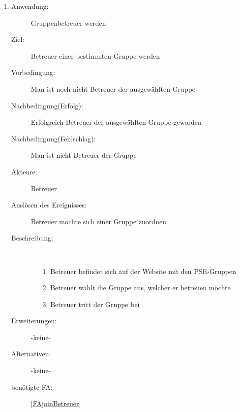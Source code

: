 \documentclass[parskip=full]{scrartcl}
\newcommand{\swtLabel}[1]{\textbf{/#1\arabic*0/}}
\begin{document}
\begin{enumerate} [label=\swtLabel{B}]
 
  \item
	\begin{description}
  		\item[Anwendung:] Gruppenbetreuer werden
  		\item[Ziel:] Betreuer einer bestimmten Gruppe werden
  		\item[Vorbedingung:] Man ist noch nicht Betreuer der ausgewählten Gruppe
  		\item[Nachbedingung(Erfolg):] Erfolgreich Betreuer der ausgewählten
  		Gruppe geworden
  		\item[Nachbedingung(Fehlschlag):] Man ist nicht Betreuer der Gruppe
  		\item[Akteure:] Betreuer
  		\item[Auslösen des Ereignisses:] Betreuer möchte sich einer Gruppe
  		zuordnen
  		\item[Beschreibung:]~
  	\begin{enumerate} 
  	  \item[1.] Betreuer befindet sich auf der Website mit den PSE-Gruppen
  	  \item[2.] Betreuer wählt die Gruppe aus, welcher er betreuen möchte
  	  \item[3.] Betreuer tritt der Gruppe bei
  	\end{enumerate}
  	\item[Erweiterungen:] -keine-
  	\item[Alternativen:] -keine-
  	\item[benötigte FA:] \ref{FAjoinBetreuer}
  \end{description}
   

\end{enumerate}
\end{document}
